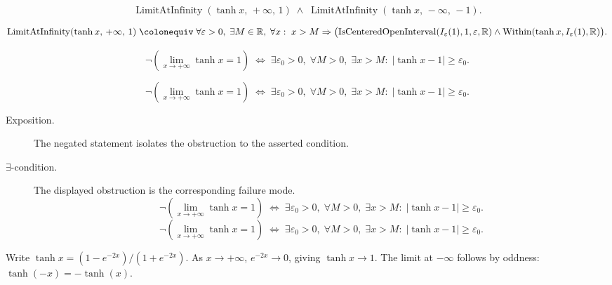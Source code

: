 \begin{remark*}
\[
  \operatorname{LimitAtInfinity}(\tanh x,\,+\infty,\,1)
  \;\wedge\;
  \operatorname{LimitAtInfinity}(\tanh x,\,-\infty,\,-1).
\]
\end{remark*}

\begin{remark*}
\[
  \operatorname{LimitAtInfinity}(\tanh x,\,+\infty,\,1)
  \;\colonequiv\;
  \forall\varepsilon>0,\;\exists M\in\mathbb{R},\;\forall x:\;
  x>M \Rightarrow
  \bigl(
    \operatorname{IsCenteredOpenInterval}(I_\varepsilon(1),1,\varepsilon,\mathbb R)
    \wedge
    \operatorname{Within}(\tanh x,I_\varepsilon(1),\mathbb R)
  \bigr).
\]
\end{remark*}

\begin{remark*}
\[
  \neg\left(\lim_{x\to+\infty}\tanh x=1\right)
  \;\iff\;
  \exists\varepsilon_0>0,\;\forall M>0,\;\exists x>M:\;
  |\tanh x - 1|\geq\varepsilon_0.
\]
\end{remark*}

\begin{remark*}
\[
\neg\left(\lim_{x\to+\infty}\tanh x=1\right)
  \;\iff\;
  \exists\varepsilon_0>0,\;\forall M>0,\;\exists x>M:\;
  |\tanh x - 1|\geq\varepsilon_0.
\]
\end{remark*}

\begin{remark*}
\begin{description}
  \item[Exposition.]
  The negated statement isolates the obstruction to the asserted condition.

  \item[\(\exists\)-condition.]
  The displayed obstruction is the corresponding failure mode.
  \[
\neg\left(\lim_{x\to+\infty}\tanh x=1\right)
  \;\iff\;
  \exists\varepsilon_0>0,\;\forall M>0,\;\exists x>M:\;
  |\tanh x - 1|\geq\varepsilon_0.
  \]
  \[
\neg\left(\lim_{x\to+\infty}\tanh x=1\right)
  \;\iff\;
  \exists\varepsilon_0>0,\;\forall M>0,\;\exists x>M:\;
  |\tanh x - 1|\geq\varepsilon_0.
  \]
\end{description}
\end{remark*}



\begin{remark*}[Interpretation]
Write $\tanh x = (1 - e^{-2x})/(1 + e^{-2x})$. As $x \to +\infty$,
$e^{-2x} \to 0$, giving $\tanh x \to 1$. The limit at $-\infty$
follows by oddness: $\tanh(-x) = -\tanh(x)$.
\end{remark*}

